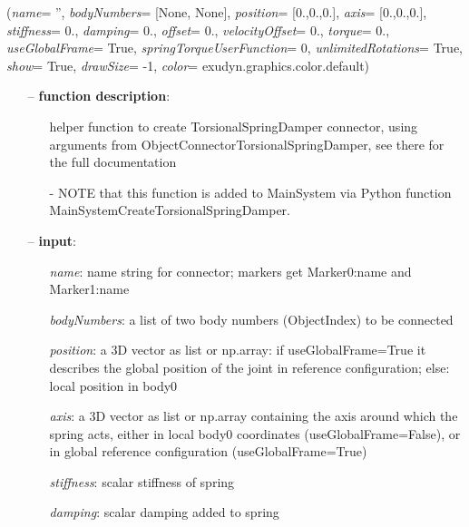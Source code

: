 %
\begin{flushleft}
\label{sec:mainsystemextensions:CreateTorsionalSpringDamper}
({\it name}= '', {\it bodyNumbers}= [None, None], {\it position}= [0.,0.,0.], {\it axis}= [0.,0.,0.], {\it stiffness}= 0., {\it damping}= 0., {\it offset}= 0., {\it velocityOffset}= 0., {\it torque}= 0., {\it useGlobalFrame}= True, {\it springTorqueUserFunction}= 0, {\it unlimitedRotations}= True, {\it show}= True, {\it drawSize}= -1, {\it color}= exudyn.graphics.color.default)
\end{flushleft}
\setlength{\itemindent}{0.7cm}
\begin{itemize}[leftmargin=0.7cm]
\item[--]
{\bf function description}: \vspace{-6pt}
\begin{itemize}[leftmargin=1.2cm]
\setlength{\itemindent}{-0.7cm}
\item[]helper function to create TorsionalSpringDamper connector, using arguments from ObjectConnectorTorsionalSpringDamper, see there for the full documentation
\item[]- NOTE that this function is added to MainSystem via Python function MainSystemCreateTorsionalSpringDamper.
\end{itemize}
\item[--]
{\bf input}: \vspace{-6pt}
\begin{itemize}[leftmargin=1.2cm]
\setlength{\itemindent}{-0.7cm}
\item[]{\it name}: name string for connector; markers get Marker0:name and Marker1:name
\item[]{\it bodyNumbers}: a list of two body numbers (ObjectIndex) to be connected
\item[]{\it position}: a 3D vector as list or np.array: if useGlobalFrame=True it describes the global position of the joint in reference configuration; else: local position in body0
\item[]{\it axis}: a 3D vector as list or np.array containing the axis around which the spring acts, either in local body0 coordinates (useGlobalFrame=False), or in global reference configuration (useGlobalFrame=True)
\item[]{\it stiffness}: scalar stiffness of spring
\item[]{\it damping}: scalar damping added to spring

\end{itemize}
\end{itemize}
